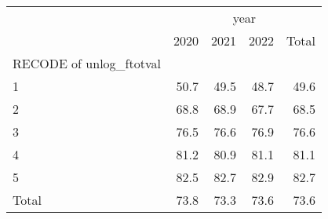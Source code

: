 \begin{tabular}{lllll}
\cline{1-5}
\multicolumn{1}{c}{} &
  \multicolumn{4}{|c}{year} \\
\multicolumn{1}{c}{} &
  \multicolumn{1}{|r}{2020} &
  \multicolumn{1}{r}{2021} &
  \multicolumn{1}{r}{2022} &
  \multicolumn{1}{r}{Total} \\
\cline{1-5}
\multicolumn{1}{l}{RECODE of unlog\_ftotval} &
  \multicolumn{1}{|r}{} &
  \multicolumn{1}{r}{} &
  \multicolumn{1}{r}{} &
  \multicolumn{1}{r}{} \\
\multicolumn{1}{l}{\hspace{1em}1} &
  \multicolumn{1}{|r}{50.7} &
  \multicolumn{1}{r}{49.5} &
  \multicolumn{1}{r}{48.7} &
  \multicolumn{1}{r}{49.6} \\
\multicolumn{1}{l}{\hspace{1em}2} &
  \multicolumn{1}{|r}{68.8} &
  \multicolumn{1}{r}{68.9} &
  \multicolumn{1}{r}{67.7} &
  \multicolumn{1}{r}{68.5} \\
\multicolumn{1}{l}{\hspace{1em}3} &
  \multicolumn{1}{|r}{76.5} &
  \multicolumn{1}{r}{76.6} &
  \multicolumn{1}{r}{76.9} &
  \multicolumn{1}{r}{76.6} \\
\multicolumn{1}{l}{\hspace{1em}4} &
  \multicolumn{1}{|r}{81.2} &
  \multicolumn{1}{r}{80.9} &
  \multicolumn{1}{r}{81.1} &
  \multicolumn{1}{r}{81.1} \\
\multicolumn{1}{l}{\hspace{1em}5} &
  \multicolumn{1}{|r}{82.5} &
  \multicolumn{1}{r}{82.7} &
  \multicolumn{1}{r}{82.9} &
  \multicolumn{1}{r}{82.7} \\
\multicolumn{1}{l}{\hspace{1em}Total} &
  \multicolumn{1}{|r}{73.8} &
  \multicolumn{1}{r}{73.3} &
  \multicolumn{1}{r}{73.6} &
  \multicolumn{1}{r}{73.6} \\
\cline{1-5}
\end{tabular}
